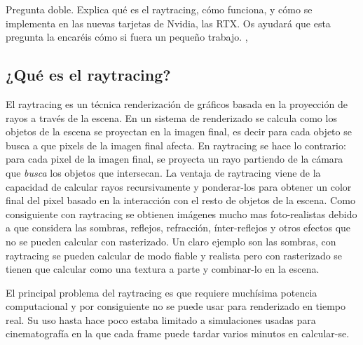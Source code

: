 
\begin{pregunta}{Pregunta doble. Explica qué es el raytracing, cómo funciona, y cómo se
    implementa en las nuevas tarjetas de Nvidia, las RTX. Os ayudará que esta
pregunta la encaréis cómo si fuera un pequeño trabajo.} \sep{}

\subsection*{¿Qué es el raytracing?}

El raytracing es un técnica renderizaci\'on de gráficos basada en la proyección de
rayos a través de la escena. En un sistema de renderizado se calcula como los objetos
de la escena se proyectan en la imagen final, es decir para cada objeto se busca
a que pixels de la imagen final afecta. En raytracing se hace lo contrario:
para cada pixel de la imagen final, se proyecta un rayo partiendo de la cámara
que \emph{busca} los objetos que intersecan. La ventaja de raytracing viene de
la capacidad de calcular rayos recursivamente y ponderar-los para obtener un
color final del pixel basado en la interacción con el resto de objetos de la
escena. Como consiguiente con raytracing se obtienen imágenes mucho mas
foto-realistas debido a que considera las sombras, reflejos, refracción,
ínter-reflejos y otros efectos que no se pueden calcular con rasterizado.
Un claro ejemplo son las sombras, con raytracing se pueden calcular de modo
fiable y realista pero con rasterizado se tienen que calcular como una textura a
parte y combinar-lo en la escena.

El principal problema del raytracing es que requiere muchísima potencia
computacional y por consiguiente no se puede usar para renderizado en tiempo
real. Su uso hasta hace poco estaba limitado a simulaciones usadas para
cinematografía en la que cada frame puede tardar varios minutos en calcular-se.



\end{pregunta}
